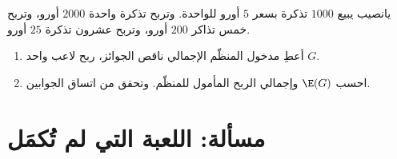 \begin{exercise}[$\star\star\star$]\label{exo:g11:prob:11}
يانصيب يبيع $1000$ تذكرة بسعر $5$ أورو للواحدة. وتربح تذكرة واحدة
$2000$ أورو، وتربح خمس تذاكر $200$ أورو، وتربح عشرون تذكرة $25$
أورو.
\begin{enumerate}
  \item أعطِ  مدخول المنظّم الإجمالي ناقص
        الجوائز،  ربح لاعب واحد $G$.
  \item احسب $\E(G)$ وإجمالي الربح المأمول للمنظّم.
        وتحقق من اتساق الجوابين.
\end{enumerate}
\end{exercise}

\section{مسألة: اللعبة التي لم تُكمَل}

